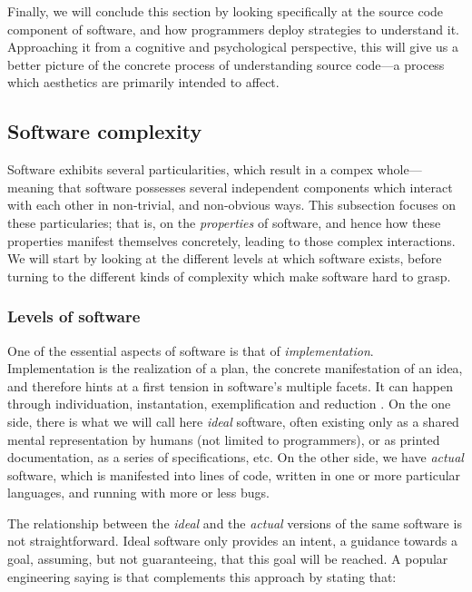 Finally, we will conclude this section by looking specifically at the source code component of software, and how programmers deploy strategies to understand it. Approaching it from a cognitive and psychological perspective, this will give us a better picture of the concrete process of understanding source code—a process which aesthetics are primarily intended to affect.

\subsection{Software complexity}
\label{subsec:software-complexity}

Software exhibits several particularities, which result in a compex whole—meaning that software possesses several independent components which interact with each other in non-trivial, and non-obvious ways. This subsection focuses on these particularies; that is, on the \emph{properties} of software, and hence how these properties manifest themselves concretely, leading to those complex interactions. We will start by looking at the different levels at which software exists, before turning to the different kinds of complexity which make software hard to grasp.

\subsubsection{Levels of software} %

One of the essential aspects of software is that of \emph{implementation}. Implementation is the realization of a plan, the concrete manifestation of an idea, and therefore hints at a first tension in software's multiple facets. It can happen through individuation, instantation, exemplification and reduction \citep{rapaport_philosophy_2005}. On the one side, there is what we will call here \emph{ideal} software, often existing only as a shared mental representation by humans (not limited to programmers), or as printed documentation, as a series of specifications, etc. On the other side, we have \emph{actual} software, which is manifested into lines of code, written in one or more particular languages, and running with more or less bugs.

The relationship between the \emph{ideal} and the \emph{actual} versions of the same software is not straightforward. Ideal software only provides an intent, a guidance towards a goal, assuming, but not guaranteeing, that this goal will be reached. A popular engineering saying is that complements this approach by stating that:

